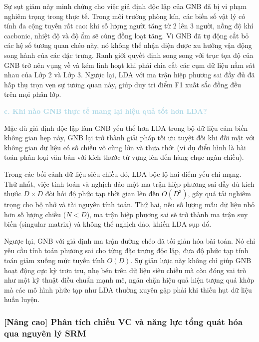Sự sụt giảm này minh chứng cho việc giả định độc lập của GNB đã bị vi phạm nghiêm trọng trong thực tế. Trong môi trường phòng kín, các biến số vật lý có tính đa cộng tuyến rất cao: khi số lượng người tăng từ 2 lên 3 người, nồng độ khí cacbonic, nhiệt độ và độ ẩm sẽ cùng đồng loạt tăng. Vì GNB đã tự động cắt bỏ các hệ số tương quan chéo này, nó không thể nhận diện được xu hướng vận động song hành của các đặc trưng. Ranh giới quyết định song song với trục tọa độ của GNB trở nên vụng về và kém linh hoạt khi phải chia cắt các cụm dữ liệu nằm sát nhau của Lớp 2 và Lớp 3. Ngược lại, LDA với ma trận hiệp phương sai đầy đủ đã hấp thụ trọn vẹn sự tương quan này, giúp duy trì điểm F1 xuất sắc đồng đều trên mọi phân lớp.

\vspace{0.5em}
\noindent\textcolor{lightblue}{\textbf{c. Khi nào GNB thực tế mang lại hiệu quả tốt hơn LDA?}}
\vspace{0.5em}

Mặc dù giả định độc lập làm GNB yếu thế hơn LDA trong bộ dữ liệu cảm biến không gian hẹp này, GNB lại trở thành giải pháp tối ưu tuyệt đối khi đối mặt với không gian dữ liệu có số chiều vô cùng lớn và thưa thớt (ví dụ điển hình là bài toán phân loại văn bản với kích thước từ vựng lên đến hàng chục ngàn chiều). 

Trong các bối cảnh dữ liệu siêu chiều đó, LDA bộc lộ hai điểm yếu chí mạng. Thứ nhất, việc tính toán và nghịch đảo một ma trận hiệp phương sai đầy đủ kích thước $D \times D$ đòi hỏi độ phức tạp thời gian lên đến $O(D^3)$, gây quá tải nghiêm trọng cho bộ nhớ và tài nguyên tính toán. Thứ hai, nếu số lượng mẫu dữ liệu nhỏ hơn số lượng chiều ($N < D$), ma trận hiệp phương sai sẽ trở thành ma trận suy biến (singular matrix) và không thể nghịch đảo, khiến LDA sụp đổ. 

Ngược lại, GNB với giả định ma trận đường chéo đã tối giản hóa bài toán. Nó chỉ yêu cầu tính toán phương sai cho từng đặc trưng độc lập, đưa độ phức tạp tính toán giảm xuống mức tuyến tính $O(D)$. Sự giản lược này không chỉ giúp GNB hoạt động cực kỳ trơn tru, nhẹ bén trên dữ liệu siêu chiều mà còn đóng vai trò như một kỹ thuật điều chuẩn mạnh mẽ, ngăn chặn hiệu quả hiện tượng quá khớp mà các mô hình phức tạp như LDA thường xuyên gặp phải khi thiếu hụt dữ liệu huấn luyện.

\subsubsection{[Nâng cao] Phân tích chiều VC và năng lực tổng quát hóa qua nguyên lý SRM}

